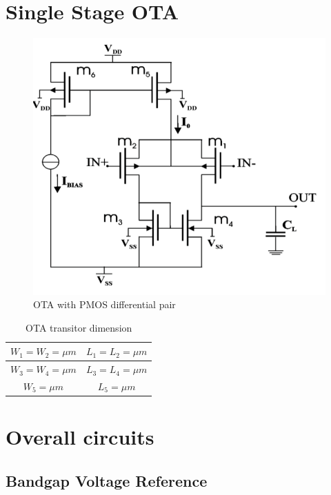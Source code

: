 \documentclass[11pt,a4paper]{report}
\begin{document}
\section{Single Stage OTA}

\begin{figure}[h]
  \begin{center}
    \includegraphics[scale=0.35]{photo/OTA_Pmos}
  \end{center}
  \caption{OTA with PMOS differential pair}
  \label{OTA}
\end{figure}

\begin{table}[h]
  \begin{center}
  \begin{tabular}{|c|c|}\hline
    $W_1 = W_2 = \mu m$ & $L_1 = L_2 = \mu m$  \\ \hline
    $W_3 = W_4 = \mu m$ & $L_3 = L_4 = \mu m$ \\ \hline
    $W_5 = \mu m$       & $L_5 = \mu m$ \\ \hline
  \end{tabular}
\end{center}
\caption{OTA transitor dimension}
\end{table}

\section{Overall circuits}
\subsection{Bandgap Voltage Reference}
\end{document}
